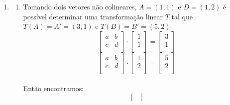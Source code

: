 \documentclass[english,ngerman,parskip=half]{scrartcl}
\begin{document}
\begin{enumerate}
    \item
        \begin{enumerate}
        \item
            Tomando dois vetores não colineares, $A = (1,1)$ e $D = (1,2)$ é possível determinar
            uma transformação linear $T$ tal que $T(A) = A' = (3,1)$ e $T(B) = B' = (5,2)$
            \begin{equation}
                \begin{bmatrix}
                a & b \\
                c & d \\
                \end{bmatrix}
                \cdot
                \begin{bmatrix}
                1 \\
                1 \\
                \end{bmatrix}
                =
                \begin{bmatrix}
                3 \\
                1 \\
                \end{bmatrix}
            \end{equation}
            \begin{equation}
                \begin{bmatrix}
                a & b \\
                c & d \\
                \end{bmatrix}
                \cdot
                \begin{bmatrix}
                1 \\
                2 \\
                \end{bmatrix}
                =
                \begin{bmatrix}
                5 \\
                2 \\
                \end{bmatrix}
            \end{equation}
             \\
            Então encontramos:
            \begin{equation}
                \begin{bmatrix}

\end{bmatrix}
\end{equation}
\end{enumerate}
\end{enumerate}
\end{document}
